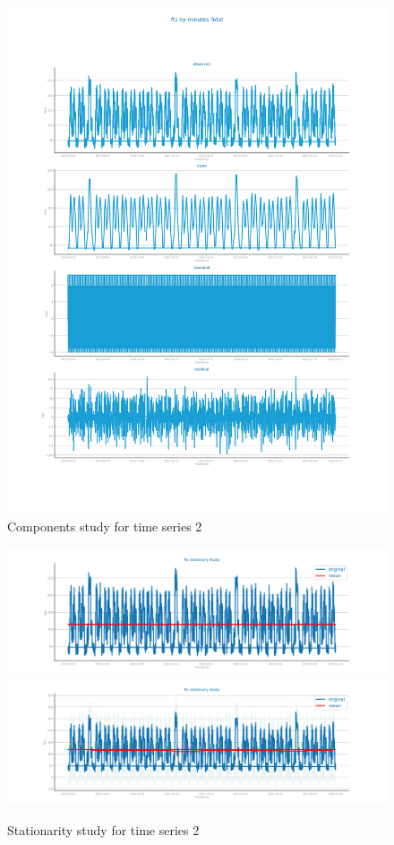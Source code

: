 \documentclass[10pt]{extarticle}
\begin{document}
\begin{figure}[H]
\centering\includegraphics[scale=0.50]{images/dataset2/time_series/fts_components_study.png}
\caption{Components study for time series 2}
\end{figure}


\begin{figure}[H]
\centering\includegraphics[scale=0.6]{images/dataset2/time_series/fts_stationarity_study_1.png}
\includegraphics[scale=0.6]{images/dataset2/time_series/fts_stationarity_study_2.png}
\caption{Stationarity study for time series 2}
\end{figure}
\end{document}
